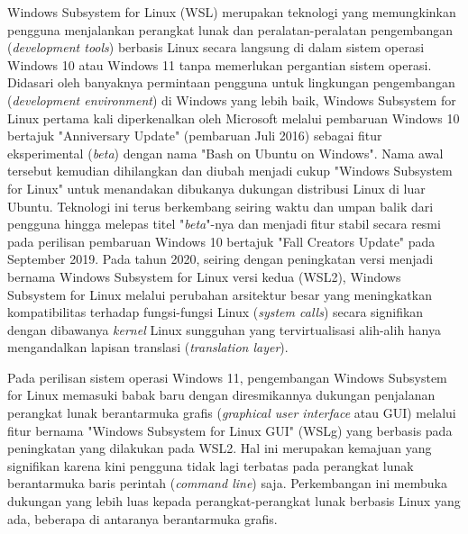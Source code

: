 Windows Subsystem for Linux (WSL) merupakan teknologi yang memungkinkan pengguna menjalankan perangkat lunak dan peralatan-peralatan pengembangan (\textit{development tools}) berbasis Linux secara langsung di dalam sistem operasi Windows 10 atau Windows 11 tanpa memerlukan pergantian sistem operasi. Didasari oleh banyaknya permintaan pengguna untuk lingkungan pengembangan (\textit{development environment}) di Windows yang lebih baik, Windows Subsystem for Linux pertama kali diperkenalkan oleh Microsoft melalui pembaruan Windows 10 bertajuk "Anniversary Update" (pembaruan Juli 2016) sebagai fitur eksperimental (\textit{beta}) dengan nama "Bash on Ubuntu on Windows". Nama awal tersebut kemudian dihilangkan dan diubah menjadi cukup "Windows Subsystem for Linux" untuk menandakan dibukanya dukungan distribusi Linux di luar Ubuntu. Teknologi ini terus berkembang seiring waktu dan umpan balik dari pengguna hingga melepas titel "\textit{beta}"-nya dan menjadi fitur stabil secara resmi pada perilisan pembaruan Windows 10 bertajuk "Fall Creators Update" pada September 2019. Pada tahun 2020, seiring dengan peningkatan versi menjadi bernama Windows Subsystem for Linux versi kedua (WSL2), Windows Subsystem for Linux melalui perubahan arsitektur besar yang meningkatkan kompatibilitas terhadap fungsi-fungsi Linux (\textit{system calls}) secara signifikan dengan dibawanya \textit{kernel} Linux sungguhan yang tervirtualisasi alih-alih hanya mengandalkan lapisan translasi (\textit{translation layer}).

Pada perilisan sistem operasi Windows 11, pengembangan Windows Subsystem for Linux memasuki babak baru dengan diresmikannya dukungan penjalanan perangkat lunak berantarmuka grafis (\textit{graphical user interface} atau GUI) melalui fitur bernama "Windows Subsystem for Linux GUI" (WSLg) yang berbasis pada peningkatan yang dilakukan pada WSL2. Hal ini merupakan kemajuan yang signifikan karena kini pengguna tidak lagi terbatas pada perangkat lunak berantarmuka baris perintah (\textit{command line}) saja. Perkembangan ini membuka dukungan yang lebih luas kepada perangkat-perangkat lunak berbasis Linux yang ada, beberapa di antaranya berantarmuka grafis.

